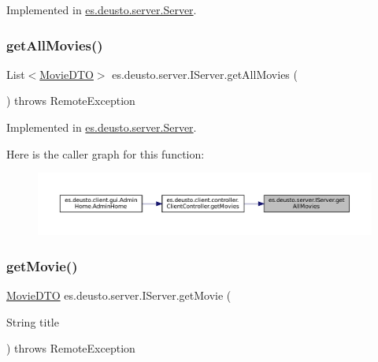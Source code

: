 Implemented in \mbox{\hyperlink{classes_1_1deusto_1_1server_1_1_server_aad2637c9cecc8a8b6f89e630b3711bff}{es.\+deusto.\+server.\+Server}}.

\mbox{\label{interfacees_1_1deusto_1_1server_1_1_i_server_adf8c1aa53cf63eafa97299c898539938}} 
\subsubsection{\texorpdfstring{getAllMovies()}{getAllMovies()}}
{\footnotesize\ttfamily List$<$\mbox{\hyperlink{classes_1_1deusto_1_1server_1_1data_1_1_movie_d_t_o}{Movie\+D\+TO}}$>$ es.\+deusto.\+server.\+I\+Server.\+get\+All\+Movies (\begin{DoxyParamCaption}{ }\end{DoxyParamCaption}) throws Remote\+Exception}



Implemented in \mbox{\hyperlink{classes_1_1deusto_1_1server_1_1_server_a12879447707ea74459bfed6fffab514b}{es.\+deusto.\+server.\+Server}}.

Here is the caller graph for this function\+:
\nopagebreak
\begin{figure}[H]
\begin{center}
\leavevmode
\includegraphics[width=350pt]{interfacees_1_1deusto_1_1server_1_1_i_server_adf8c1aa53cf63eafa97299c898539938_icgraph}
\end{center}
\end{figure}
\mbox{\label{interfacees_1_1deusto_1_1server_1_1_i_server_a2b7883e416d98a7c92de13cbed7af450}} 
\subsubsection{\texorpdfstring{getMovie()}{getMovie()}}
{\footnotesize\ttfamily \mbox{\hyperlink{classes_1_1deusto_1_1server_1_1data_1_1_movie_d_t_o}{Movie\+D\+TO}} es.\+deusto.\+server.\+I\+Server.\+get\+Movie (\begin{DoxyParamCaption}\item[{String}]{title }\end{DoxyParamCaption}) throws Remote\+Exception}



